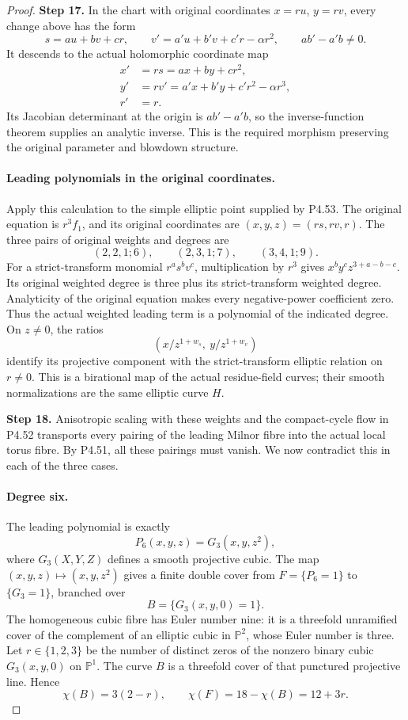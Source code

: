 \begin{proof}
\noindent\textbf{Step 17.} In the chart with original coordinates
\(x=r u\), \(y=r v\), every change above has the form
\[
 s=a u+b v+c r,\qquad
 v'=a'u+b'v+c'r-\alpha r^2,
 \qquad ab'-a'b\ne0.
\]
It descends to the actual holomorphic coordinate map
\[
 \begin{aligned}
 x'&=r s=a x+b y+c r^2,\\
 y'&=r v'=a'x+b'y+c'r^2-\alpha r^3,\\
 r'&=r.
 \end{aligned}                                        \tag{4.54w.5}
\]
Its Jacobian determinant at the origin is \(ab'-a'b\),
so the inverse-function theorem supplies an analytic inverse.
This is the required morphism preserving the original
parameter and blowdown structure.

\paragraph{Leading polynomials in the original coordinates.}
Apply this calculation to the simple elliptic point supplied
by P4.53. The original equation is $r^3f_1$, and its original
coordinates are $(x,y,z)=(rs,rv,r)$. The three pairs of
original weights and degrees are
\[
 (2,2,1;6),\qquad (2,3,1;7),\qquad (3,4,1;9).
\]
For a strict-transform monomial $r^as^bv^c$, multiplication
by $r^3$ gives $x^by^cz^{3+a-b-c}$. Its original weighted
degree is three plus its strict-transform weighted degree.
Analyticity of the original equation makes every
negative-power coefficient zero. Thus the actual weighted
leading term is a polynomial of the indicated degree.
On $z\ne0$, the ratios
\[
     \left(x/z^{1+w_s},\ y/z^{1+w_v}\right)
\]
identify its projective component with the strict-transform
elliptic relation on $r\ne0$. This is a birational map
of the actual residue-field curves; their smooth
normalizations are the same elliptic curve $H$.

\noindent\textbf{Step 18.} Anisotropic scaling with these weights and the compact-cycle
flow in P4.52 transports every pairing of the leading
Milnor fibre into the actual local torus fibre. By P4.51,
all these pairings must vanish. We now contradict this
in each of the three cases.

\paragraph{Degree six.}
The leading polynomial is exactly
\[
                    P_6(x,y,z)=G_3(x,y,z^2),
\]
where $G_3(X,Y,Z)$ defines a smooth projective cubic.
The map $(x,y,z)\mapsto(x,y,z^2)$ gives a finite double
cover from $F=\{P_6=1\}$ to $\{G_3=1\}$, branched over
\[
                       B=\{G_3(x,y,0)=1\}.
\]
The homogeneous cubic fibre has Euler number nine: it
is a threefold unramified cover of the complement of
an elliptic cubic in $\mathbb P^2$, whose Euler number
is three. Let $r\in\{1,2,3\}$ be the number of distinct
zeros of the nonzero binary cubic $G_3(x,y,0)$ on
$\mathbb P^1$. The curve $B$ is a threefold cover of
that punctured projective line. Hence
\[
          \chi(B)=3(2-r),\qquad \chi(F)=18-\chi(B)=12+3r.
\]


\end{proof}
